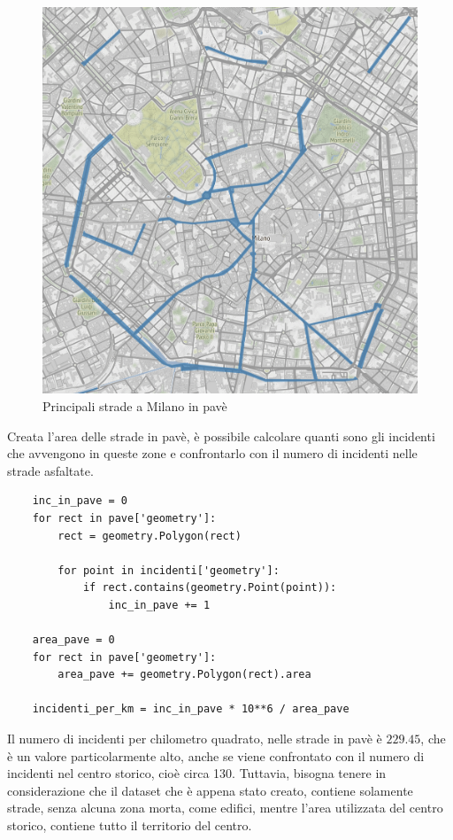 \documentclass[a4paper]{report}
\begin{document}
\begin{figure}
    \includegraphics[width=\linewidth]{../src/pave/mappa_pave.png}
    \caption{Principali strade a Milano in pavè}
    \label{fig:mappa-pave}
\end{figure}

Creata l'area delle strade in pavè, è possibile calcolare quanti sono gli incidenti che 
avvengono in queste zone e confrontarlo con il numero di incidenti nelle strade asfaltate.

\begin{lstlisting}
    inc_in_pave = 0
    for rect in pave['geometry']: 
        rect = geometry.Polygon(rect)

        for point in incidenti['geometry']: 
            if rect.contains(geometry.Point(point)): 
                inc_in_pave += 1

    area_pave = 0
    for rect in pave['geometry']: 
        area_pave += geometry.Polygon(rect).area

    incidenti_per_km = inc_in_pave * 10**6 / area_pave
\end{lstlisting}

Il numero di incidenti per chilometro quadrato, nelle strade in pavè è  $229.45$, che è un valore 
particolarmente alto, anche se viene confrontato con il numero di incidenti nel centro storico, 
cioè circa 130.
Tuttavia, bisogna tenere in considerazione che il dataset che è appena stato creato, contiene solamente 
strade, senza alcuna zona morta, come edifici, mentre l'area utilizzata del centro storico, 
contiene tutto il territorio del centro.
\end{document}

